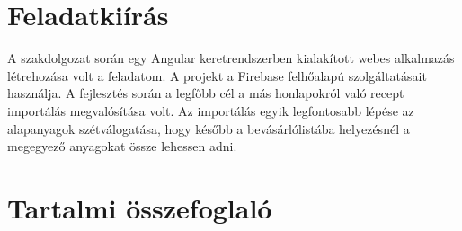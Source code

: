 \documentclass[12pt]{report}
\theoremstyle{definition}
\begin{document}
\chapter*{Feladatkiírás}

A szakdolgozat során egy Angular keretrendszerben kialakított webes alkalmazás létrehozása volt a feladatom. A projekt a Firebase felhőalapú szolgáltatásait használja. A fejlesztés során a legfőbb cél a más honlapokról való recept importálás megvalósítása volt. Az importálás egyik legfontosabb lépése az alapanyagok szétválogatása, hogy később a bevásárlólistába helyezésnél a megegyező anyagokat össze lehessen adni.   

\chapter*{Tartalmi összefoglaló}
\end{document}
